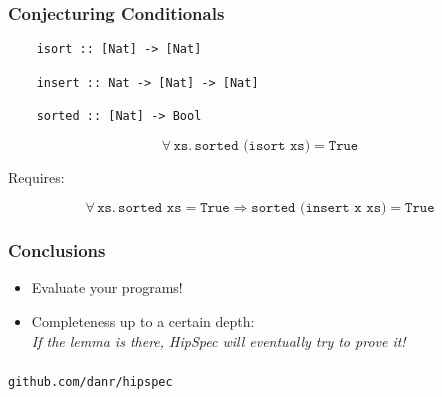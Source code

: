 \documentclass[serif,professionalfont]{beamer}
\newcommand\fa[1]{ \forall \, #1 . \,}
\newcommand\hs[1]{\texttt{#1}}
\newcommand\xs[0]{\hs{xs}}
\begin{document}
\begin{frame}[fragile]
  \frametitle{Conjecturing Conditionals}

  \begin{verbatim}
    isort :: [Nat] -> [Nat]

    insert :: Nat -> [Nat] -> [Nat]

    sorted :: [Nat] -> Bool
  \end{verbatim}

  \begin{equation*}
    \fa{\xs}  \hs{sorted (isort xs)} = \hs{True}
  \end{equation*}


  Requires:

  \begin{equation*}
    \fa{\xs}  \hs{sorted xs} = \hs{True} \Rightarrow
              \hs{sorted (insert x xs)} = \hs{True}
  \end{equation*}


\end{frame}


\begin{frame}
  \frametitle{Conclusions}
  \begin{itemize}
    \item Evaluate your programs!
    \item Completeness up to a certain depth: \\
          \emph{If the lemma is there, HipSpec will eventually try to prove it!}
  \end{itemize}
\end{frame}

\begin{frame}
\frametitle{}
\begin{center}
\hs{github.com/danr/hipspec}
\end{center}
\end{frame}
\end{document}
